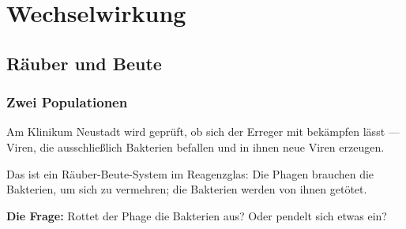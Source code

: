\part{Wechselwirkung}

\chapter{Räuber und Beute}

\section{Zwei Populationen}

\begin{merksatz}
Am Klinikum Neustadt wird geprüft, ob sich der Erreger mit  bekämpfen lässt --- Viren, die ausschließlich Bakterien befallen und in ihnen neue Viren erzeugen.

\begin{center}
\begin{minipage}{0.9\textwidth}
Das ist ein Räuber-Beute-System im Reagenzglas: Die Phagen brauchen die Bakterien, um sich zu vermehren; die Bakterien werden von ihnen getötet.
\end{minipage}
\end{center}

\textbf{Die Frage:} Rottet der Phage die Bakterien aus? Oder pendelt sich etwas ein?
\end{merksatz}

